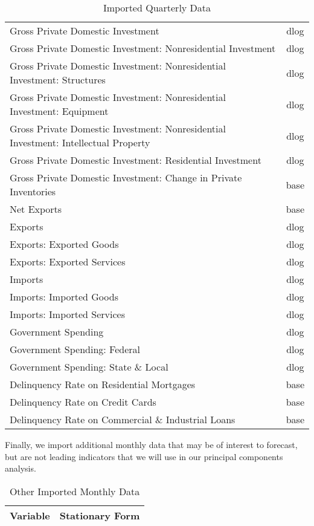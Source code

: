 \documentclass[11pt, letterpaper]{article}\usepackage[]{graphicx}\usepackage[]{color}
\begin{document}
\begin{table}[H]
\begin{tabular}{lc}
  Gross Private Domestic Investment & dlog \\ 
  Gross Private Domestic Investment: Nonresidential Investment & dlog \\ 
  Gross Private Domestic Investment: Nonresidential Investment: Structures & dlog \\ 
  Gross Private Domestic Investment: Nonresidential Investment: Equipment & dlog \\ 
  Gross Private Domestic Investment: Nonresidential Investment: Intellectual Property & dlog \\ 
  Gross Private Domestic Investment: Residential Investment & dlog \\ 
  Gross Private Domestic Investment: Change in Private Inventories & base \\ 
  Net Exports & base \\ 
  Exports & dlog \\ 
  Exports: Exported Goods & dlog \\ 
  Exports: Exported Services & dlog \\ 
  Imports & dlog \\ 
  Imports: Imported Goods & dlog \\ 
  Imports: Imported Services & dlog \\ 
  Government Spending & dlog \\ 
  Government Spending: Federal & dlog \\ 
  Government Spending: State \& Local & dlog \\ 
  Delinquency Rate on Residential Mortgages & base \\ 
  Delinquency Rate on Credit Cards & base \\ 
  Delinquency Rate on Commercial \& Industrial Loans & base \\ 
   \hline
\end{tabular}
\endgroup
\caption{Imported Quarterly Data} 
\end{table}


Finally, we import additional monthly data that may be of interest to forecast, but are not leading indicators that we will use in our principal components analysis.
\begin{table}[H]
\centering
\begingroup\scriptsize
\begin{tabular}{lc}
  \hline
Variable & Stationary Form \\ 
  \hline
\hline
\end{tabular}
\endgroup
\caption{Other Imported Monthly Data} 
\end{table}
\end{document}
